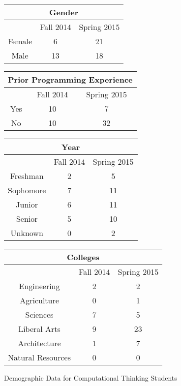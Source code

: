 \begin{figure*}
\begin{minipage}{\linewidth}
\centering
	\begin{tabular}{c|c|c}
	  \multicolumn{3}{c}{Gender}\\\hline
		& Fall 2014 & Spring 2015 \\\hline
		Female & 6 & 21 \\
		Male & 13 & 18 \\
	\end{tabular}
\centering
	\begin{tabular}{c|c|c}
	  \multicolumn{3}{c}{Prior Programming Experience}\\\hline
		& Fall 2014 & Spring 2015 \\\hline
		Yes & 10 & 7 \\
		No & 10 & 32 \\
	\end{tabular}

\vspace{20pt}

\centering
	\begin{tabular}{c|c|c}
		\multicolumn{3}{c}{Year}\\\hline
		& Fall 2014 & Spring 2015 \\\hline
		Freshman & 2 & 5 \\
		Sophomore & 7 & 11 \\
		Junior & 6 & 11 \\
		Senior & 5 & 10 \\
		Unknown & 0 & 2 \\
	\end{tabular}
\centering	
	\begin{tabular}{c|c|c}
	  \multicolumn{3}{c}{Colleges}\\\hline
		& Fall 2014 & Spring 2015 \\\hline
		Engineering & 2 & 2 \\
		Agriculture & 0 & 1 \\
		Sciences & 7 & 5 \\
		Liberal Arts & 9 & 23 \\
		Architecture & 1 & 7 \\
		Natural Resources & 0 & 0 \\
	\end{tabular}
\end{minipage}
\caption{Demographic Data for Computational Thinking Students}
\label{data-demographics}
\end{figure*}


